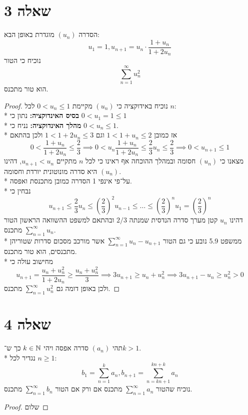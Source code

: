 \section{שאלה 3}
הסדרה $(u_n)$ מוגדרת באופן הבא:
\[
	u_1 = 1, u_{n + 1} = u_n \cdot \frac{1 + u_n}{1 + 2u_n}
\]
נוכיח כי הטור
\[
	\sum_{n = 1}^{\infty} u_n^2
\]
הוא טור מתכנס.
\begin{proof}
	נוכיח באידוקציה כי $(u_n)$ מקיימת $0 < u_n \le 1$ לכל $n$: \\*
	\textbf{בסיס האינדוקציה:}
	נתון כי $0 < u_1 = 1 \le 1$ \\*
	\textbf{מהלך האינדוקציה:}
	נניח כי $0 < u_n \le 1$. \\*
	אז כמובן $1 < 1 + u_n \le 2$ וגם $1 < 1 + 2u_n \le 3$ ולכן בהתאם
	\[
		0 < \frac{1 + u_n}{1 + 2u_n} \le \frac{2}{3}
		\implies 0 < u_n \frac{1 + u_n}{1 + 2u_n} \le \frac{2}{3} u_n \le \frac{2}{3}
		\implies 0 < u_{n + 1} \le 1
	\]
	מצאנו כי $(u_n)$ חסומה ובמהלך ההוכחה אף ראינו כי לכל $n$ מתקיים $u_{n + 1} < u_n$, דהינו $(u_n)$ היא סדרה מונוטונית יורדת וחסומה. \\*
	על־פי אינפי 1 הסדרה כמובן מתכנסת ואפסה. \\*
	נבחין כי 
	\[
		u_{n + 1} \le \frac{2}{3} u_n \le {(\frac{2}{3})}^2 u_{n - 1} \le \dots \le {(\frac{2}{3})}^n u_1 = {(\frac{2}{3})}^n
	\]
	דהינו $u_n$ קטן מערך סדרה הנדסית שמנתה $2/3$ ובהתאם למשפט ההשוואה הראשון הטור $\sum_{n = 1}^{\infty} u_n$ מתכנס. \\*
	ממשפט 5.9 נובע כי גם הטור $\sum_{n = 1}^{\infty} u_n - u_{n + 1}$ אשר מורכב מסכום סדרות שטוריהן מתכנסים, הוא טור מתכנס. \\*
	מחישוב עולה כי
	\[
		u_{n + 1}
		= \frac{u_n + u_n^2}{1 + 2u_n}
		\ge \frac{u_n + u_n^2}{3}
		\implies 3u_{n + 1} \ge u_n + u_n^2
		\implies 3u_{n + 1} - u_n \ge u_n^2 > 0
	\]
	ולכן באופן דומה גם $\sum_{n = 1}^{\infty} u_n^2$ מתכנס.
\end{proof}

\section{שאלה 4}
תהי $(a_n)$ סדרה אפסה ויהי $k \in \mathbb{N}$ כך ש־$k > 1$. \\*
נגדיר לכל $n \ge 1$:
\[
	b_1 = \sum_{n = 1}^{k} a_n,
	b_{n + 1} = \sum_{n = kn + 1}^{kn + k} a_n
\]
נוכיח שהטור $\sum_{n = 1}^{\infty} a_n$ מתכנס אם ורק אם הטור $\sum_{n = 1}^{\infty} b_n$ מתכנס.
\begin{proof}
	שלום
\end{proof}



